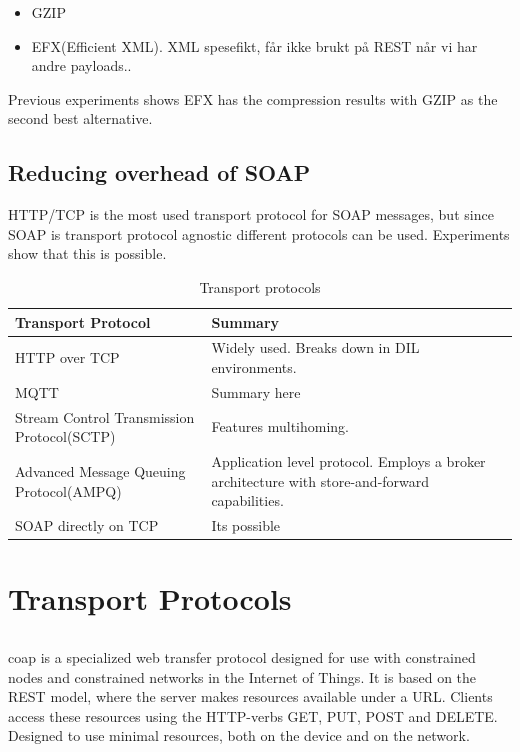 \documentclass[USenglish]{ifimaster}
\begin{document}
\begin{itemize}
\item GZIP

\item EFX(Efficient XML). XML spesefikt, får ikke brukt på REST når vi har andre
payloads..

\end{itemize}

Previous experiments shows EFX has the compression results with GZIP as the
second best alternative\cite{johnsen-trude-compression-techniqes}.


\subsection{Reducing overhead of SOAP}
HTTP/TCP is the most used transport protocol for SOAP messages, but since SOAP is transport protocol agnostic different protocols can be used. Experiments show that this is possible.


\begin{table}[h]
\begin{tabularx}{\textwidth}{| X | X |}
\hline
  \textbf{Transport Protocol} & \textbf{Summary} \\ \hline
  HTTP over TCP & Widely used. Breaks down in DIL environments.\\ \hline
  MQTT & Summary here\\ \hline
  Stream Control Transmission Protocol(SCTP) & Features multihoming. \\ \hline
  Advanced Message Queuing Protocol(AMPQ) & Application level protocol. Employs
  a broker architecture with store-and-forward capabilities. \\ \hline
  SOAP directly on TCP & Its possible \\ \hline
\end{tabularx}
\caption{Transport protocols}
\end{table}


\section{Transport Protocols}

\subsection{}

\gls{coap} is a specialized web transfer protocol designed for use with
constrained nodes and constrained networks in the Internet of Things. It is
based on the REST model, where the server makes resources available  under a
URL. Clients access these resources using the HTTP-verbs GET, PUT, POST and
DELETE. Designed to use minimal resources, both on the device and on the
network.
\end{document}
